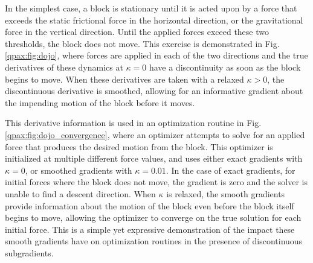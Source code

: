 In the simplest case, a block is stationary until it is acted upon by a force that exceeds the static frictional force in the horizontal direction, or the gravitational force in the vertical direction. Until the applied forces exceed these two thresholds, the block does not move. This exercise is demonstrated in Fig. \ref{qpax:fig:dojo}, where forces are applied in each of the two directions and the true derivatives of these dynamics at $\kappa=0$ have a discontinuity as soon as the block begins to move. When these derivatives are taken with a relaxed $\kappa > 0$, the discontinuous derivative is smoothed, allowing for an informative gradient about the impending motion of the block before it moves. 

This derivative information is used in an optimization routine in Fig. \ref{qpax:fig:dojo_convergence}, where an optimizer attempts to solve for an applied force that produces the desired motion from the block. This optimizer is initialized at multiple different force values, and uses either exact gradients with $\kappa=0$, or smoothed gradients with $\kappa=0.01$. In the case of exact gradients, for initial forces where the block does not move, the gradient is zero and the solver is unable to find a descent direction. When $\kappa$ is relaxed, the smooth gradients provide information about the motion of the block even before the block itself begins to move, allowing the optimizer to converge on the true solution for each initial force. This is a simple yet expressive demonstration of the impact these smooth gradients have on optimization routines in the presence of discontinuous subgradients. 
